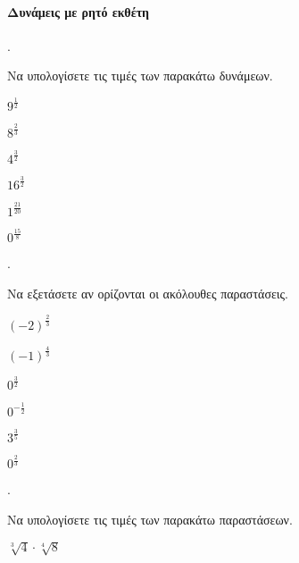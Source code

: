 \documentclass[11pt,a4paper,twocolumn]{article}
\newcounter{askhsh}
\newcommand{\askhsh}{\large\theaskhsh.\ \addtocounter{askhsh}{1}}
\begin{document}
\paragraph{Δυνάμεις με ρητό εκθέτη}
\askhsh Να υπολογίσετε τις τιμές των παρακάτω δυνάμεων.
\begin{multicols}{3}
\begin{alist}
\item $9^{\frac{1}{2}}$
\item $8^{\frac{2}{3}}$
\item $4^{\frac{3}{2}}$
\item $16^{\frac{3}{2}}$
\item $1^{\frac{21}{20}}$
\item $0^{\frac{15}{8}}$
\end{alist}
\end{multicols}
\askhsh Να εξετάσετε αν ορίζονται οι ακόλουθες παραστάσεις.
\begin{multicols}{3}
\begin{alist}
\item $(-2)^{\frac{2}{3}}$
\item $(-1)^{\frac{4}{3}}$
\item $0^{\frac{3}{2}}$
\item $0^{-\frac{1}{2}}$
\item $3^{\frac{3}{5}}$
\item $0^{\frac{2}{3}}$
\end{alist}
\end{multicols}
\askhsh Να υπολογίσετε τις τιμές των παρακάτω παραστάσεων.
\begin{multicols}{2}
\begin{alist}
\item $\sqrt[3]{4}\cdot\sqrt[4]{8}$
\end{alist}
\end{multicols}
\end{document}
